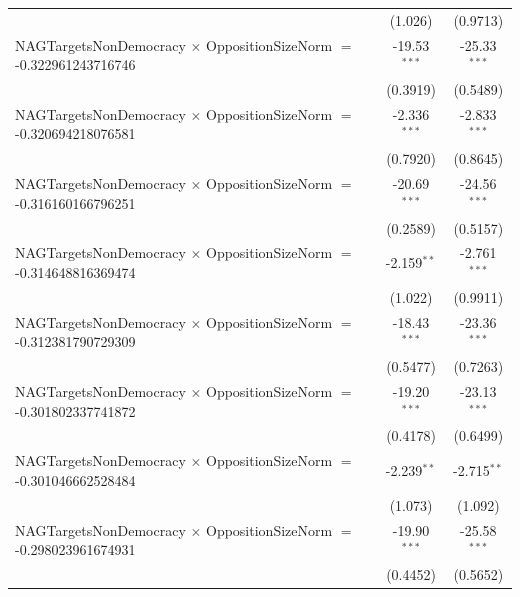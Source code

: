 \begin{tabular}{lcc}
                                                                                & (1.026)              & (0.9713)\\   
   NAGTargetsNonDemocracy $\times$ OppositionSizeNorm $=$ -0.322961243716746    & -19.53$^{***}$       & -25.33$^{***}$\\   
                                                                                & (0.3919)             & (0.5489)\\   
   NAGTargetsNonDemocracy $\times$ OppositionSizeNorm $=$ -0.320694218076581    & -2.336$^{***}$       & -2.833$^{***}$\\   
                                                                                & (0.7920)             & (0.8645)\\   
   NAGTargetsNonDemocracy $\times$ OppositionSizeNorm $=$ -0.316160166796251    & -20.69$^{***}$       & -24.56$^{***}$\\   
                                                                                & (0.2589)             & (0.5157)\\   
   NAGTargetsNonDemocracy $\times$ OppositionSizeNorm $=$ -0.314648816369474    & -2.159$^{**}$        & -2.761$^{***}$\\   
                                                                                & (1.022)              & (0.9911)\\   
   NAGTargetsNonDemocracy $\times$ OppositionSizeNorm $=$ -0.312381790729309    & -18.43$^{***}$       & -23.36$^{***}$\\   
                                                                                & (0.5477)             & (0.7263)\\   
   NAGTargetsNonDemocracy $\times$ OppositionSizeNorm $=$ -0.301802337741872    & -19.20$^{***}$       & -23.13$^{***}$\\   
                                                                                & (0.4178)             & (0.6499)\\   
   NAGTargetsNonDemocracy $\times$ OppositionSizeNorm $=$ -0.301046662528484    & -2.239$^{**}$        & -2.715$^{**}$\\   
                                                                                & (1.073)              & (1.092)\\   
   NAGTargetsNonDemocracy $\times$ OppositionSizeNorm $=$ -0.298023961674931    & -19.90$^{***}$       & -25.58$^{***}$\\   
                                                                                & (0.4452)             & (0.5652)\\   

\end{tabular}
